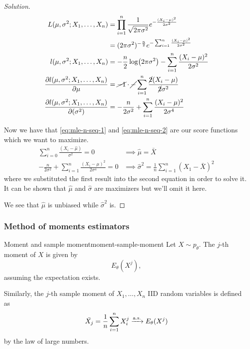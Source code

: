 \documentclass[12pt]{extarticle}
\newcommand{\convas}{\xrightarrow{\operatorfont a.s.}}
\begin{document}
\begin{proof}[Solution]
    \begin{align}
        L(\mu,\sigma^2; X_1, \dots, X_n)                   & = \prod_{i = 1}^n \frac{1}{\sqrt{2 \pi \sigma^2}} e^{-\frac{(X_i - \mu)^2}{2 \sigma^2}}                                 \\
                                                           & = (2 \pi \sigma^2)^{-\frac{n}{2}} e^{- \sum_{i = 1}^n \frac{(X_i - \mu)^2}{2 \sigma^2}}                                 \\
        l(\mu,\sigma^2; X_1, \dots, X_n)                   & = -\frac{n}{2}\log(2 \pi \sigma^2) - \sum_{i = 1}^n \frac{(X_i - \mu)^2}{2 \sigma^2}                                    \\
        \pdv{l(\mu,\sigma^2; X_1, \dots, X_n)}{\mu}        & = \cancel{-1 }\cdot \cancel{-} \sum_{i = 1}^n \frac{\cancel{2}(X_i - \mu)}{\cancel{2} \sigma^2}  \label{eq:mle-n-seq-1} \\
        \pdv{l(\mu,\sigma^2; X_1, \dots, X_n)}{(\sigma^2)} & = -\frac{n}{2 \sigma^2} + \sum_{i = 1}^n \frac{(X_i - \mu)^2}{2 \sigma^4} \label{eq:mle-n-seq-2}
    \end{align}

    Now we have that \cref{eq:mle-n-seq-1} and \cref{eq:mle-n-seq-2} are our score functions which we want to maximize.
    \begin{align}
        \sum_{i = 0}^{n} \frac{(X_i - \hat \mu)}{\sigma^2} = 0                      & \implies \hat \mu = \bar X                                            \\
        -\frac{n}{2 \sigma^2} + \sum_{i = 1}^n \frac{(X_i - \mu)^2}{2 \sigma^4} = 0 & \implies \hat{\sigma}^2 = \frac{1}{n} \sum_{i = 1}^n (X_1 - \bar X)^2
    \end{align}
    where we substituted the first result into the second equation in order to solve it.
    It can be shown that $\hat \mu$ and $\hat \sigma$ are maximizers but we'll omit it here.

    We see that $\hat \mu$ is unbiased while $\hat \sigma ^2$ is.
\end{proof}

\subsubsection{Method of moments estimators}

\begin{definition}{Moment and sample moment}{moment-sample-moment}
    Let $X \sim p_\theta$. The $j$-th moment of $X$ is given by
    \begin{equation}
        E_\theta(X^j),
    \end{equation}
    assuming the expectation exists.

    Similarly, the $j$-th sample moment of $X_1,\dots, X_n$ IID random variables is defined as
    \begin{equation}
        \bar{X_j} = \frac{1}{n} \sum_{i = 1}^n X_i^j \convas E_\theta(X^j)
    \end{equation}
    by the law of large numbers.
\end{definition}
\end{document}
